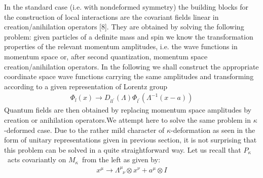 \documentclass[a4paper,a4paper]{article}
\begin{document}
In the standard case (i.e. with nondeformed symmetry) the building
blocks for the  construction of local interactions are the
covariant fields linear in creation/anihilation operators [8].
They are obtained by solving the following problem: given
particles of a definite mass and spin we know the transformation
properties of the relevant momentum amplitudes, i.e.  the wave
functions in momentum space or, after second quantization,
momentum space creation/anihilation operators. In the following
we shall construct the appropriate coordinate space wave functions
carrying the same amplitudes and transforming according to a
given representation of  Lorentz group
\begin{eqnarray}\label{wz16}
\Phi_{l}(x)\rightarrow
D_{ll^{\prime}}(\Lambda)\Phi_{l^{\prime}}(\Lambda^{-1}(x-a))
\label{w9} %
\end{eqnarray}
Quantum fields are then obtained by replacing momentum space
amplitudes by creation or anihilation operators.\newline We
attempt here to solve the same problem in $\kappa$-deformed case.
Due to the rather mild character of $\kappa$-deformation as seen
in  the form of unitary representations given in previous section,
it is not surprising that this
problem can be solved in a quite straightforward way. Let us  recall
that $%
P_{\kappa}$\ acts covariantly
on $M_{\kappa}$\ from the left as given
by:
\renewcommand{\theequation}{17\alph{equation}}
\setcounter{equation}{0}
\begin{eqnarray}\label{wz17}
x^{\mu}\rightarrow \Lambda^{\mu}_{\;\;\nu}\otimes
x^{\nu}+a^{\mu}\otimes I
\label{w10}  %
\end{eqnarray}
\end{document}
